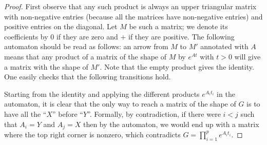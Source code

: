 \begin{proof}
First observe that any such product is always an upper triangular matrix with
non-negative entries (because all the matrices have non-negative entries) and positive
entries on the diagonal. Let $M$ be such a matrix; we denote its coefficients by
$0$ if they are zero and $+$ if they are positive.
The following automaton should be read as follows: an arrow from $M$ to $M'$ annotated with $A$ means that any product
of a matrix of the shape of $M$ by $e^{At}$ with $t>0$ will give a matrix with the shape of $M'$. Note that the empty product gives the identity.
One easily checks that the following transitions hold.
\begin{center}
\end{center}
Starting from the identity and applying the different products $e^{A_{i}t_{i}}$ in the automaton,
it is clear that the only way to reach a matrix of the shape of $G$ is to have all
the ``$X$'' before ``$Y$''. Formally, by contradiction, if there were $i<j$ such
that $A_{i}=Y$ and $A_{j}=X$ then by the automaton, we would end up with a matrix where
the top right corner is nonzero, which contradicts $G=\prod_{i=1}^{p} e^{A_{i} t_{i}}$.
\end{proof}

